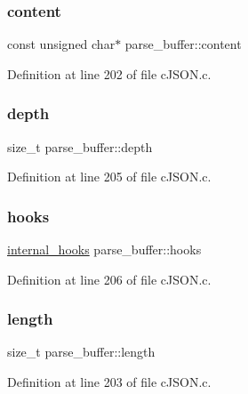 \subsubsection{\texorpdfstring{content}{content}}
{\footnotesize\ttfamily const unsigned char$\ast$ parse\+\_\+buffer\+::content}



Definition at line 202 of file c\+J\+S\+O\+N.\+c.

\mbox{\label{structparse__buffer_af613c4ed7d73f76c60c50d1bcf4c67a0}} 
\subsubsection{\texorpdfstring{depth}{depth}}
{\footnotesize\ttfamily size\+\_\+t parse\+\_\+buffer\+::depth}



Definition at line 205 of file c\+J\+S\+O\+N.\+c.

\mbox{\label{structparse__buffer_a2c3e99b15da2935fc5d58124ffb4a894}} 
\subsubsection{\texorpdfstring{hooks}{hooks}}
{\footnotesize\ttfamily \hyperlink{structinternal__hooks}{internal\+\_\+hooks} parse\+\_\+buffer\+::hooks}



Definition at line 206 of file c\+J\+S\+O\+N.\+c.

\mbox{\label{structparse__buffer_a036970e9335896d3cee8459eda9e2eb9}} 
\subsubsection{\texorpdfstring{length}{length}}
{\footnotesize\ttfamily size\+\_\+t parse\+\_\+buffer\+::length}



Definition at line 203 of file c\+J\+S\+O\+N.\+c.


